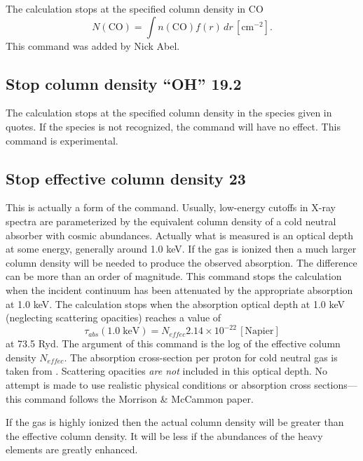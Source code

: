 The calculation stops at the specified column density in CO
\begin{equation}
N\left( {{\mathrm{CO}}} \right) = \int {n\left( {{\mathrm{CO}}} \right)f\left( r
\right)\,dr}
\,[\mathrm{cm}^{-2}] .%
\end{equation}
This command was added by Nick Abel.

\begin{shaded}
\subsection{\experimental Stop column density ``OH'' 19.2}
The calculation stops at the specified column density in the species given in quotes.  If the species is not recognized, the command will have no effect.  This command is experimental.
\end{shaded}

\subsection{Stop effective column density 23  }

This is actually a form of the  command.
Usually, low-energy cutoffs in X-ray spectra are
parameterized by the equivalent column density of a cold neutral absorber
with cosmic abundances.
Actually what is measured is an optical depth at
some energy, generally around 1.0 keV.
If the gas is ionized then a much
larger column density will be needed to produce the observed absorption.
The difference can be more than an order of magnitude.
This command stops
the calculation when the incident continuum has been attenuated by the
appropriate absorption at 1.0 keV.
The calculation stops when the absorption
optical depth at 1.0 keV (neglecting scattering opacities)
reaches a value of
\begin{equation}
\tau _{abs} \left( {1.0\;{\mathrm{keV}}} \right) = N_{effec} 2.14 \times 10^{
- 22}
\, [\mathrm{Napier}]
\end{equation}
at 73.5 Ryd.
The argument of this command is the log of the effective column
density $N_{effec}$.
The absorption cross-section per proton for cold neutral
gas is taken from \citet{Morrison1983}.
Scattering opacities \emph{are not} included in this optical depth.
No attempt is made to use realistic
physical conditions or absorption cross sections---this command follows
the Morrison \& McCammon paper.

If the gas is highly ionized then the actual column density will be
greater than the effective column density.
It will be less if the abundances
of the heavy elements are greatly enhanced.

